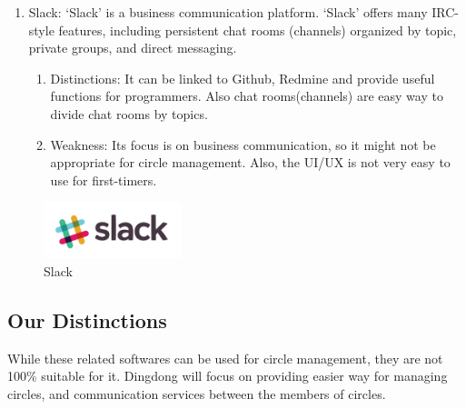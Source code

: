 \documentclass[conference]{IEEEtran}
\begin{document}
\begin{enumerate}
    \item Slack: `Slack' is a business communication platform. `Slack' offers many IRC-style features, including persistent chat rooms (channels) organized by topic, private groups, and direct messaging.
    \begin{enumerate}
        \item Distinctions: It can be linked to Github, Redmine and provide useful functions for programmers. Also chat rooms(channels) are easy way to divide chat rooms by topics.
        \item Weakness: Its focus is on business communication, so it might not be appropriate for circle management. Also, the UI/UX is not very easy to use for first-timers.
    \end{enumerate}
\end{enumerate}
\begin{figure}[h]
        \centering
        \includegraphics[width=4cm]{images/slack.png}
        \caption{Slack}
        \label{fig:my_label}
    \end{figure}
\subsection{Our Distinctions}
While these related softwares can be used for circle management, they are not 100\% suitable for it. Dingdong will focus on providing easier way for managing circles, and communication services between the members of circles. 
\end{document}
